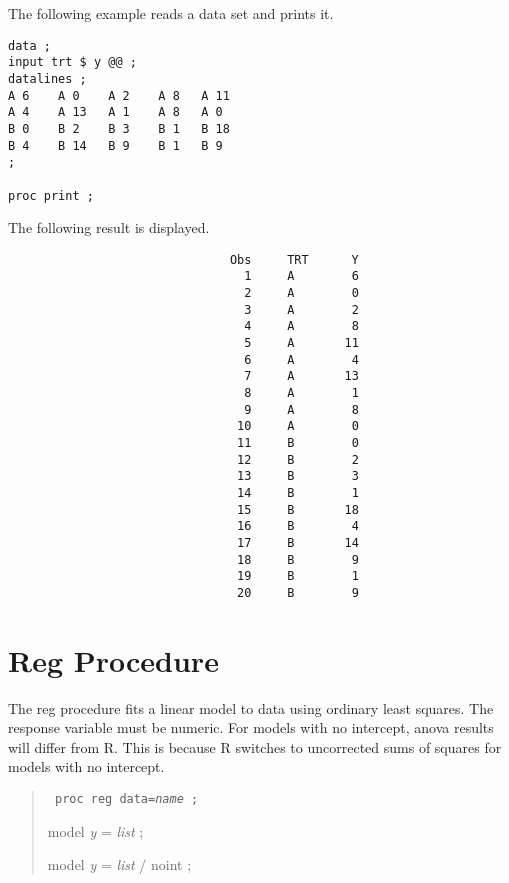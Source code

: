 \documentclass[12pt]{article}
\begin{document}
The following example reads a data set
and prints it.

{\scriptsize\begin{verbatim}
data ;
input trt $ y @@ ;
datalines ;
A 6    A 0    A 2    A 8   A 11
A 4    A 13   A 1    A 8   A 0
B 0    B 2    B 3    B 1   B 18
B 4    B 14   B 9    B 1   B 9
;

proc print ;
\end{verbatim}}

The following result is displayed.

{\scriptsize\begin{verbatim}
                               Obs     TRT      Y
                                 1     A        6
                                 2     A        0
                                 3     A        2
                                 4     A        8
                                 5     A       11
                                 6     A        4
                                 7     A       13
                                 8     A        1
                                 9     A        8
                                10     A        0
                                11     B        0
                                12     B        2
                                13     B        3
                                14     B        1
                                15     B       18
                                16     B        4
                                17     B       14
                                18     B        9
                                19     B        1
                                20     B        9
\end{verbatim}}

\newpage

\section{Reg Procedure}

The reg procedure fits a linear model to data
using ordinary least squares.
The response variable must be numeric.
For models with no intercept, anova results will differ from R.
This is because R switches to uncorrected sums of squares
for models with no intercept.

\begin{quote}
{\tt
proc reg data={\it name} ;

model {\it y} = {\it list} ;

model {\it y} = {\it list} / noint ;
}
\end{quote}
\end{document}
